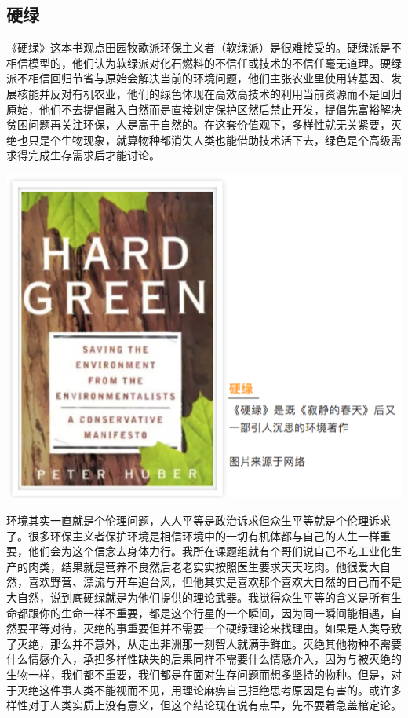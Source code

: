\documentclass[
]{book}
\begin{document}
\hypertarget{ux786cux7eff}{%
\subsection{硬绿}\label{ux786cux7eff}}

《硬绿》这本书观点田园牧歌派环保主义者（软绿派）是很难接受的。硬绿派是不相信模型的，他们认为软绿派对化石燃料的不信任或技术的不信任毫无道理。硬绿派不相信回归节省与原始会解决当前的环境问题，他们主张农业里使用转基因、发展核能并反对有机农业，他们的绿色体现在高效高技术的利用当前资源而不是回归原始，他们不去提倡融入自然而是直接划定保护区然后禁止开发，提倡先富裕解决贫困问题再关注环保，人是高于自然的。在这套价值观下，多样性就无关紧要，灭绝也只是个生物现象，就算物种都消失人类也能借助技术活下去，绿色是个高级需求得完成生存需求后才能讨论。

\includegraphics[width=8.33in]{images/miejue6}

环境其实一直就是个伦理问题，人人平等是政治诉求但众生平等就是个伦理诉求了。很多环保主义者保护环境是相信环境中的一切有机体都与自己的人生一样重要，他们会为这个信念去身体力行。我所在课题组就有个哥们说自己不吃工业化生产的肉类，结果就是营养不良然后老老实实按照医生要求天天吃肉。他很爱大自然，喜欢野营、漂流与开车追台风，但他其实是喜欢那个喜欢大自然的自己而不是大自然，说到底硬绿就是为他们提供的理论武器。我觉得众生平等的含义是所有生命都跟你的生命一样不重要，都是这个行星的一个瞬间，因为同一瞬间能相遇，自然要平等对待，灭绝的事重要但并不需要一个硬绿理论来找理由。如果是人类导致了灭绝，那么并不意外，从走出非洲那一刻智人就满手鲜血。灭绝其他物种不需要什么情感介入，承担多样性缺失的后果同样不需要什么情感介入，因为与被灭绝的生物一样，我们都不重要，我们都是在面对生存问题而想多坚持的物种。但是，对于灭绝这件事人类不能视而不见，用理论麻痹自己拒绝思考原因是有害的。或许多样性对于人类实质上没有意义，但这个结论现在说有点早，先不要着急盖棺定论。
\end{document}
